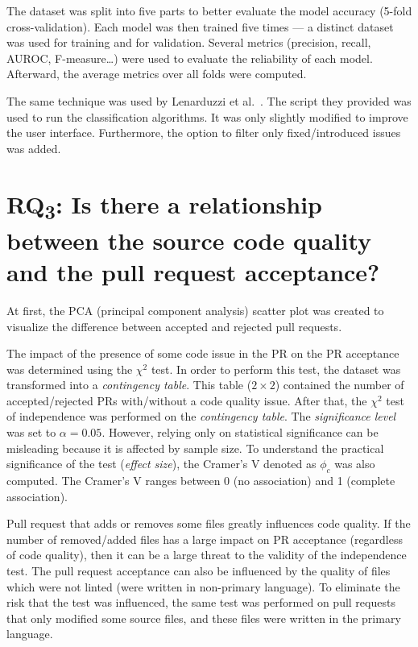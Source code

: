 \documentclass[digital,oneside,oldtable,nolof,nolot,nocover]{fithesis4}
\begin{document}
The dataset was split into five parts to better evaluate the model accuracy
(5-fold cross-validation).  Each model was then trained five times ---
a distinct dataset was used for training and for validation.  Several metrics
(precision, recall, AUROC, F-measure\dots{}) were used to evaluate the
reliability of each model. Afterward, the average metrics over all folds
were computed.

The same technique was used by Lenarduzzi et al.~\cite{quality}. The script
they provided was used to run the classification algorithms. It was only
slightly modified to improve the user interface. Furthermore, the option
to filter only fixed/introduced issues was added.
\section{RQ\textsubscript{3}: Is there a relationship between the source code quality and the pull request acceptance?}
\label{sec:orgd1d92a8}
At first, the PCA (principal component analysis) scatter plot was created to
visualize the difference between accepted and rejected pull requests.

The impact of the presence of some code issue in the PR on the PR acceptance was
determined using the \(\chi^2\) test. In order to perform this test, the dataset
was transformed into a \emph{contingency table}.  This table (\(2 \times 2\)) contained
the number of accepted/rejected PRs with/without a code quality issue.
After that, the \(\chi^2\) test of independence was performed on the
\emph{contingency table}.  The \emph{significance level} was set to \(\alpha =
   0.05\). However, relying only on statistical significance can be misleading
because it is affected by sample size. To understand the practical
significance of the test (\emph{effect size}), the Cramer's V denoted as \(\phi_c\)
was also computed. The Cramer's V ranges between 0 (no
association) and 1 (complete association).

Pull request that adds or removes some files greatly influences
code quality. If the number of removed/added files has a large impact on PR
acceptance (regardless of code quality), then it can be a large threat to
the validity of the independence test.  The pull request acceptance can also be
influenced by the quality of files which were not linted (were written in
non-primary language).  To eliminate the risk that the test was influenced,
the same test was performed on pull requests that only modified some source
files, and these files were written in the primary language.
\end{document}
